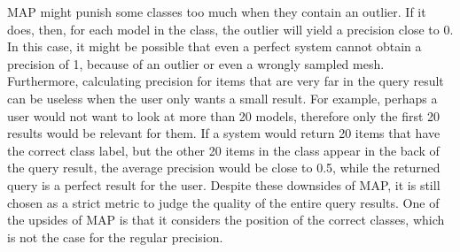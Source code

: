 \documentclass{bigdata}
\begin{document}
MAP  might punish some classes too much when they contain an outlier. If it does, then, for each model in the class, the outlier will yield a precision close to 0. In this case, it might be possible that even a perfect system cannot obtain a precision of 1, because of an outlier or even a wrongly sampled mesh. Furthermore, calculating precision for items that are very far in the query result can be useless when the user only wants a small result. For example, perhaps a user would not want to look at more than 20 models, therefore only the first 20 results would be relevant for them. If a system would return 20 items that have the correct class label, but the other 20 items in the class appear in the back of the query result, the average precision would be close to 0.5, while the returned query is a perfect result for the user. Despite these downsides of MAP, it is still chosen as a strict metric to judge the quality of the entire query results. One of the upsides of MAP is that it considers the position of the correct classes, which is not the case for the regular precision. 
\end{document}
